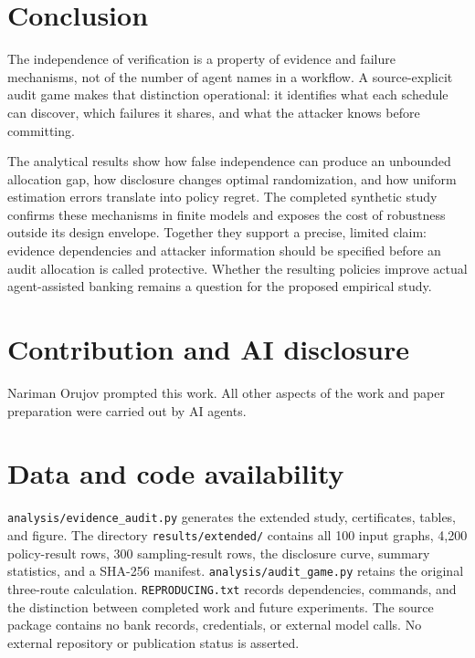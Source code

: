\documentclass[11pt,letterpaper]{article}
\begin{document}
\section{Conclusion}

The independence of verification is a property of evidence and failure mechanisms, not of the number of agent names in a workflow. A source-explicit audit game makes that distinction operational: it identifies what each schedule can discover, which failures it shares, and what the attacker knows before committing.

The analytical results show how false independence can produce an unbounded allocation gap, how disclosure changes optimal randomization, and how uniform estimation errors translate into policy regret. The completed synthetic study confirms these mechanisms in finite models and exposes the cost of robustness outside its design envelope. Together they support a precise, limited claim: evidence dependencies and attacker information should be specified before an audit allocation is called protective. Whether the resulting policies improve actual agent-assisted banking remains a question for the proposed empirical study.

\section*{Contribution and AI disclosure}

Nariman Orujov prompted this work. All other aspects of the work and paper preparation were carried out by AI agents.

\section*{Data and code availability}

\texttt{analysis/evidence\_audit.py} generates the extended study, certificates, tables, and figure. The directory \texttt{results/extended/} contains all 100 input graphs, 4,200 policy-result rows, 300 sampling-result rows, the disclosure curve, summary statistics, and a SHA-256 manifest. \texttt{analysis/audit\_game.py} retains the original three-route calculation. \texttt{REPRODUCING.txt} records dependencies, commands, and the distinction between completed work and future experiments. The source package contains no bank records, credentials, or external model calls. No external repository or publication status is asserted.



\end{document}
